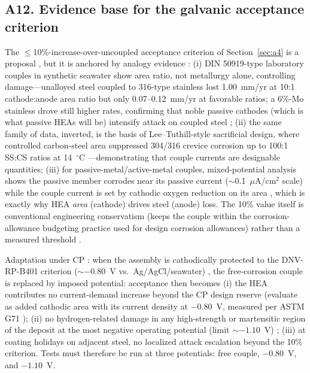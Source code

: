 \subsection{A12. Evidence base for the galvanic acceptance criterion}
\label{sec:a12}

The $\leq$10\%-increase-over-uncoupled acceptance criterion of Section~\ref{sec:a4} is a proposal \prop{}, but it is anchored by analogy evidence \evid{}: (i) DIN 50919-type laboratory couples in synthetic seawater show area ratio, not metallurgy alone, controlling damage---unalloyed steel coupled to 316-type stainless lost 1.00~mm/yr at 10:1 cathode:anode area ratio but only 0.07--0.12~mm/yr at favorable ratios; a 6\%-Mo stainless drove still higher rates, confirming that noble passive cathodes (which is what passive HEAs will be) intensify attack on coupled steel \cite{nickelinst_galvanic}; (ii) the same family of data, inverted, is the basis of Lee--Tuthill-style sacrificial design, where controlled carbon-steel area suppressed 304/316 crevice corrosion up to 100:1 SS:CS ratios at 14~$^{\circ}$C \cite{totalmateria_galvanic}---demonstrating that couple currents are designable quantities; (iii) for passive-metal/active-metal couples, mixed-potential analysis shows the passive member corrodes near its passive current ($\sim$0.1~$\mu$A/cm$^2$ scale) while the couple current is set by cathodic oxygen reduction on its area \cite{cnwra_galvanic}, which is exactly why HEA \emph{area} (cathode) drives steel (anode) loss. The 10\% value itself is conventional engineering conservatism (keeps the couple within the corrosion-allowance budgeting practice used for design corrosion allowances) rather than a measured threshold \prop{}.

Adaptation under CP \prop{}: when the assembly is cathodically protected to the DNV-RP-B401 criterion ($\sim-0.80$~V vs.\ Ag/AgCl/seawater) \cite{dnv_rpb401}, the free-corrosion couple is replaced by imposed potential: acceptance then becomes (i) the HEA contributes no current-demand increase beyond the CP design reserve (evaluate as added cathodic area with its current density at $-0.80$~V, measured per ASTM G71 \cite{astm_g71}); (ii) no hydrogen-related damage in any high-strength or martensitic region of the deposit at the most negative operating potential (limit $\sim-1.10$~V) \cite{dnv_rpb401}; (iii) at coating holidays on adjacent steel, no localized attack escalation beyond the 10\% criterion. Tests must therefore be run at three potentials: free couple, $-0.80$~V, and $-1.10$~V.

